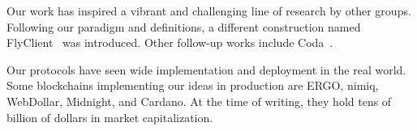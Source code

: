 Our work has inspired a vibrant and challenging line of research by other
groups. Following our paradigm and definitions, a different
construction named FlyClient~\cite{flyclient} was introduced. Other follow-up
works include Coda~\cite{coda}.

Our protocols have seen wide implementation and deployment in the real world.
Some blockchains implementing our ideas in production are ERGO, nimiq, WebDollar,
Midnight, and Cardano. At the time of writing, they hold tens of billion of
dollars in market capitalization.

